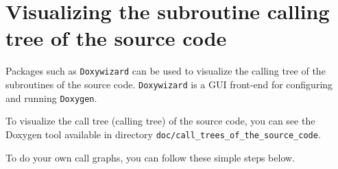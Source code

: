\section{Visualizing the subroutine calling tree of the source code}

\noindent
Packages such as \texttt{Doxywizard} can be used to visualize the calling tree of the
subroutines of the  source code. \texttt{Doxywizard} is
a GUI front-end for configuring and running \texttt{Doxygen}.

To visualize the call tree (calling tree) of the source code, you can see the Doxygen tool available in directory \texttt{doc/call\_trees\_of\_the\_source\_code}.

\bigskip

\noindent To do your own call graphs, you can follow these simple steps below.

